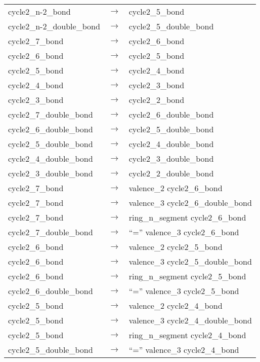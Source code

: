 \begin{longtable}{m{} p{} p{}}
    cycle2\_n-2\_bond & $\rightarrow$ & cycle2\_5\_bond \\
    cycle2\_n-2\_double\_bond & $\rightarrow$ & cycle2\_5\_double\_bond \\
    cycle2\_7\_bond & $\rightarrow$ & cycle2\_6\_bond \\
    cycle2\_6\_bond & $\rightarrow$ & cycle2\_5\_bond \\
    cycle2\_5\_bond & $\rightarrow$ & cycle2\_4\_bond \\
    cycle2\_4\_bond & $\rightarrow$ & cycle2\_3\_bond \\
    cycle2\_3\_bond & $\rightarrow$ & cycle2\_2\_bond \\
    cycle2\_7\_double\_bond & $\rightarrow$ & cycle2\_6\_double\_bond \\
    cycle2\_6\_double\_bond & $\rightarrow$ & cycle2\_5\_double\_bond \\
    cycle2\_5\_double\_bond & $\rightarrow$ & cycle2\_4\_double\_bond \\
    cycle2\_4\_double\_bond & $\rightarrow$ & cycle2\_3\_double\_bond \\
    cycle2\_3\_double\_bond & $\rightarrow$ & cycle2\_2\_double\_bond \\
    cycle2\_7\_bond & $\rightarrow$ & valence\_2 cycle2\_6\_bond \\
    cycle2\_7\_bond & $\rightarrow$ & valence\_3 cycle2\_6\_double\_bond \\
    cycle2\_7\_bond & $\rightarrow$ & ring\_n\_segment cycle2\_6\_bond \\
    cycle2\_7\_double\_bond & $\rightarrow$ & ``='' valence\_3 cycle2\_6\_bond \\
    cycle2\_6\_bond & $\rightarrow$ & valence\_2 cycle2\_5\_bond \\
    cycle2\_6\_bond & $\rightarrow$ & valence\_3 cycle2\_5\_double\_bond \\
    cycle2\_6\_bond & $\rightarrow$ & ring\_n\_segment cycle2\_5\_bond \\
    cycle2\_6\_double\_bond & $\rightarrow$ & ``='' valence\_3 cycle2\_5\_bond \\
    cycle2\_5\_bond & $\rightarrow$ & valence\_2 cycle2\_4\_bond \\
    cycle2\_5\_bond & $\rightarrow$ & valence\_3 cycle2\_4\_double\_bond \\
    cycle2\_5\_bond & $\rightarrow$ & ring\_n\_segment cycle2\_4\_bond \\
    cycle2\_5\_double\_bond & $\rightarrow$ & ``='' valence\_3 cycle2\_4\_bond \\

\end{longtable}
